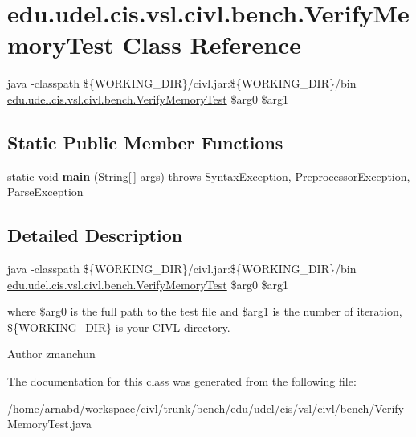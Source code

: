 \hypertarget{classedu_1_1udel_1_1cis_1_1vsl_1_1civl_1_1bench_1_1VerifyMemoryTest}{}\section{edu.\+udel.\+cis.\+vsl.\+civl.\+bench.\+Verify\+Memory\+Test Class Reference}
\label{classedu_1_1udel_1_1cis_1_1vsl_1_1civl_1_1bench_1_1VerifyMemoryTest}


java -\/classpath \$\{W\+O\+R\+K\+I\+N\+G\+\_\+\+D\+I\+R\}/civl.jar\+:\$\{W\+O\+R\+K\+I\+N\+G\+\_\+\+D\+I\+R\}/bin \hyperlink{classedu_1_1udel_1_1cis_1_1vsl_1_1civl_1_1bench_1_1VerifyMemoryTest}{edu.\+udel.\+cis.\+vsl.\+civl.\+bench.\+Verify\+Memory\+Test} \$arg0 \$arg1  


\subsection*{Static Public Member Functions}
\begin{DoxyCompactItemize}
\item 
\hypertarget{classedu_1_1udel_1_1cis_1_1vsl_1_1civl_1_1bench_1_1VerifyMemoryTest_a23573ee7e8d6ccb300d6506d75a3071e}{}static void {\bfseries main} (String\mbox{[}$\,$\mbox{]} args)  throws Syntax\+Exception, 			\+Preprocessor\+Exception, Parse\+Exception \label{classedu_1_1udel_1_1cis_1_1vsl_1_1civl_1_1bench_1_1VerifyMemoryTest_a23573ee7e8d6ccb300d6506d75a3071e}

\end{DoxyCompactItemize}


\subsection{Detailed Description}
java -\/classpath \$\{W\+O\+R\+K\+I\+N\+G\+\_\+\+D\+I\+R\}/civl.jar\+:\$\{W\+O\+R\+K\+I\+N\+G\+\_\+\+D\+I\+R\}/bin \hyperlink{classedu_1_1udel_1_1cis_1_1vsl_1_1civl_1_1bench_1_1VerifyMemoryTest}{edu.\+udel.\+cis.\+vsl.\+civl.\+bench.\+Verify\+Memory\+Test} \$arg0 \$arg1 

where \$arg0 is the full path to the test file and \$arg1 is the number of iteration, \$\{W\+O\+R\+K\+I\+N\+G\+\_\+\+D\+I\+R\} is your \hyperlink{classedu_1_1udel_1_1cis_1_1vsl_1_1civl_1_1CIVL}{C\+I\+V\+L} directory.

\begin{DoxyAuthor}{Author}
zmanchun 
\end{DoxyAuthor}


The documentation for this class was generated from the following file\+:\begin{DoxyCompactItemize}
\item 
/home/arnabd/workspace/civl/trunk/bench/edu/udel/cis/vsl/civl/bench/Verify\+Memory\+Test.\+java\end{DoxyCompactItemize}
